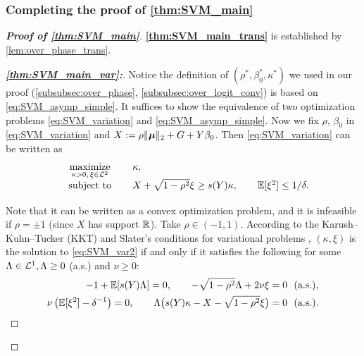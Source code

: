 \subsubsection{Completing the proof of \cref{thm:SVM_main}}
\begin{proof}[\textbf{Proof of \cref{thm:SVM_main}}]
\noindent
\textbf{\ref{thm:SVM_main_trans}} is established by \cref{lem:over_phase_trans}.

\begin{proof}[\textbf{\emph{\ref{thm:SVM_main_var}:}}]
Notice the definition of $(\rho^*, \beta_0^*, \kappa^*)$ we used in our proof (\cref{subsubsec:over_phase}, \ref{subsubsec:over_logit_conv}) is based on \cref{eq:SVM_asymp_simple}. It suffices to show the equivalence of two optimization problems \cref{eq:SVM_variation} and \eqref{eq:SVM_asymp_simple}. Now we fix $\rho$, $\beta_0$ in \cref{eq:SVM_variation} and $X := \rho \| \text{\boldmath $\mu$}\|_2 + G + Y \beta_0$. Then \cref{eq:SVM_variation} can be written as
\begin{equation}\label{eq:SVM_var2}
    \begin{aligned}
        \begin{array}{cl}
            \underset{ \kappa > 0 , \, \xi \in \cL^2  }{ \mathrm{maximize} } & \kappa, \\
            \underset{ \phantom{\smash{\bm\beta \in \R^d, \beta_0 \in \R, \kappa \in \R} } }{\text{subject to}} &  
            X + \sqrt{1 - \rho^2} \xi \ge s(Y) \kappa,  
            \qquad \E[\xi^2]  \le  1/\delta .
        \end{array}
    \end{aligned}
\end{equation}
Note that it can be written as a convex optimization problem, and it is infeasible if $\rho = \pm 1$ (since $X$ has support $\mathbb{R}$). Take $\rho \in (-1, 1)$. According to the Karush--Kuhn--Tucker (KKT) and Slater's conditions for variational problems \cite[Theorem 2.9.2]{zalinescu2002convex}, $(\kappa, \xi)$ is the solution to \cref{eq:SVM_var2} if and only if it satisfies the following for some $\Lambda \in \mathcal{L}^1, \Lambda \ge 0$ (a.s.) and $\nu \ge 0$:
\begin{equation*}
    \begin{aligned}
        -1 + \E[s(Y)\Lambda] = 0, \qquad
        -\sqrt{1 - \rho^2} \Lambda + 2 \nu \xi = 0 \ \  \text{(a.s.)},  \\
        \nu\left( \E[\xi^2] - \delta^{-1} \right) = 0,
        \qquad
        \Lambda \bigl( s(Y)\kappa - X - \sqrt{1 - \rho^2} \xi \bigr) = 0 \ \  \text{(a.s.)}.

\end{aligned}
\end{equation*}
\end{proof}
\end{proof}
